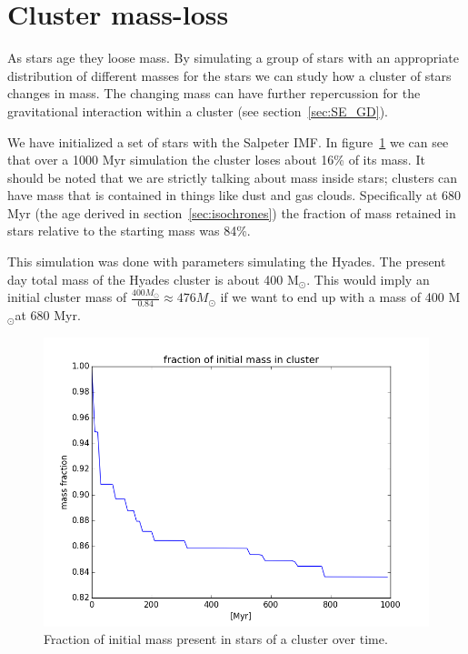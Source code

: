 \documentclass{aa}
\newcommand{\Sun}[0]{\ensuremath{_{\odot}}}
\begin{document}
\section{Cluster mass-loss} \label{sec:massloss}
As stars age they loose mass. By simulating a group of stars with an appropriate distribution of different masses for the stars we can study how a cluster of stars changes in mass. The changing mass can have further repercussion for the gravitational interaction within a cluster (see section~\ref{sec:SE_GD}). 

We have initialized a set of stars with the Salpeter IMF. In figure~\ref{fig:massfraction} we can see that over a 1000 Myr simulation the cluster loses about 16\% of its mass. It should be noted that we are strictly talking about mass inside stars; clusters can have mass that is contained in things like dust and gas clouds. Specifically at 680 Myr (the age derived in section~\ref{sec:isochrones}) the fraction of mass retained in stars relative to the starting mass was 84\%. 

This simulation was done with parameters simulating the Hyades. The present day total mass of the Hyades cluster is about 400 M\Sun \citep{2009AIPC.1094..497B}. This would imply an initial cluster mass of $\frac{400 M\Sun}{0.84} \approx 476 M\Sun$ if we want to end up with a mass of 400 M\Sun at 680 Myr. 
\begin{figure}
    \centering
    \includegraphics[width=\hsize]{img/massfraction_over_time.png}
    \caption{Fraction of initial mass present in stars of a cluster over time.}\label{fig:massfraction}
\end{figure}
\end{document}
